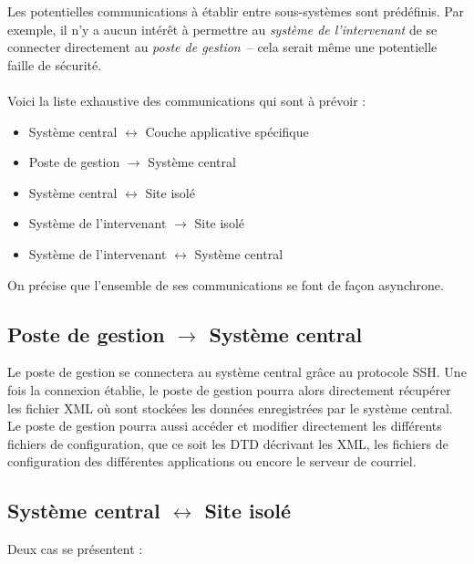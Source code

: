 \documentclass[a4paper, 11pt, final]{article}
\begin{document}
Les potentielles communications à établir entre sous-systèmes sont prédéfinis.
Par exemple, il n'y a aucun intérêt à permettre au \emph{système de l'intervenant}
de se connecter directement au \emph{poste de gestion}~-- cela serait même une
potentielle faille de sécurité.

\paragraph{}
Voici la liste exhaustive des communications qui sont à prévoir :
\begin{itemize}
\item Système central $\leftrightarrow$ Couche applicative spécifique
\item Poste de gestion $\rightarrow$ Système central
\item Système central $\leftrightarrow$ Site isolé
\item Système de l'intervenant $\rightarrow$ Site isolé
\item Système de l'intervenant $\leftrightarrow$ Système central
\end{itemize}

On précise que l'ensemble de ses communications se font de façon asynchrone.


\subsection{Poste de gestion $\rightarrow$ Système central}
Le poste de gestion se connectera au système central grâce au protocole SSH.
Une fois la connexion établie, le poste de gestion pourra alors directement
récupérer les fichier XML où sont stockées les données enregistrées par le
système central. Le poste de gestion pourra aussi accéder et modifier
directement les différents fichiers de configuration, que ce soit les DTD
décrivant les XML, les fichiers de configuration des différentes applications
ou encore le serveur de courriel.



\subsection{Système central $\leftrightarrow$ Site isolé}
Deux cas se présentent :
\end{document}
